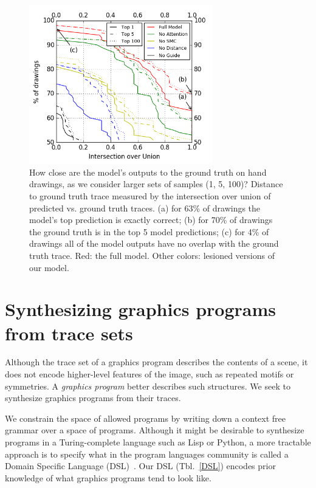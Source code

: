 \documentclass{article}
\theoremstyle{definition}
\begin{document}
\begin{figure}[h]\centering
  \begin{minipage}[c]{0.57\textwidth} 
    \centering  \includegraphics[width = 8cm]{figures/drawingAccuracy.png}
  \end{minipage}\hfill%
      \begin{minipage}[c]{0.4\textwidth} 
  \caption{How close are the model's outputs to the ground truth on hand drawings, as we consider larger sets of samples (1, 5, 100)?
    Distance to ground truth trace measured by the intersection over union of predicted vs. ground truth traces. (a) for 63\% of drawings the model's top prediction is exactly correct; (b) for 70\% of drawings the ground truth is in the top 5 model predictions; (c) for 4\% of drawings all of the model outputs have no overlap with the ground truth trace. Red: the full model. Other colors: lesioned versions of our model.}\label{drawingIntersectionOverUnion}
      \end{minipage}
            \vspace{-1cm}
\end{figure}





\section{Synthesizing graphics programs from trace sets}\label{programSynthesisSection}
Although the trace set of a graphics program describes the contents
of a scene, it does not encode higher-level features of the image,
such as repeated motifs or symmetries.  A \emph{graphics
  program} better describes such structures.
We seek to synthesize graphics programs from their traces.

We constrain the space of allowed programs by writing down a context
free grammar over a space of programs. Although it might be desirable
to synthesize programs in a Turing-complete language such as Lisp or
Python, a more tractable approach is to specify what in the program
languages community is called a Domain Specific Language (DSL)~\cite{polozov2015flashmeta}. Our DSL (Tbl.~\ref{DSL})
encodes prior knowledge of what graphics programs tend to look like.
\end{document}
